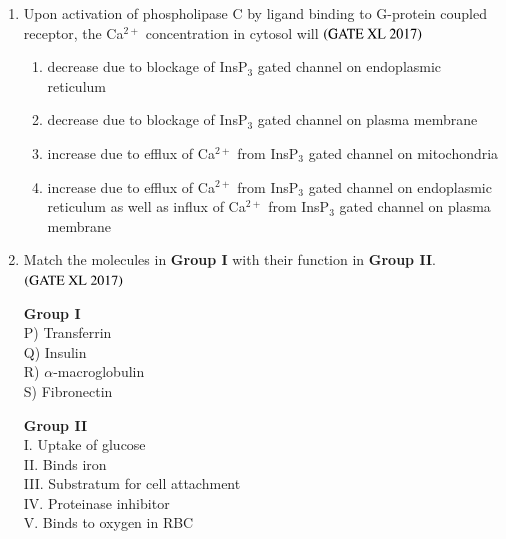 \documentclass[journal]{IEEEtran}
\begin{document}
\begin{enumerate}
\item Upon activation of phospholipase C by ligand binding to G-protein coupled receptor, the Ca$^{2+}$ concentration in cytosol will \hfill $\left(\text{GATE XL 2017}\right)$
\begin{enumerate}
    \item decrease due to blockage of InsP$_3$ gated channel on endoplasmic reticulum
    \item decrease due to blockage of InsP$_3$ gated channel on plasma membrane
    \item increase due to efflux of Ca$^{2+}$ from InsP$_3$ gated channel on mitochondria
    \item increase due to efflux of Ca$^{2+}$ from InsP$_3$ gated channel on endoplasmic reticulum as well as influx of Ca$^{2+}$ from InsP$_3$ gated channel on plasma membrane
\end{enumerate}

\item Match the molecules in \textbf{Group I} with their function in \textbf{Group II}. \hfill $\left(\text{GATE XL 2017}\right)$

\begin{multicols}{2}
\noindent \textbf{Group I} \\
P) Transferrin \\
Q) Insulin \\
R) $\alpha$-macroglobulin \\
S) Fibronectin \\

\columnbreak

\noindent \textbf{Group II} \\
I. Uptake of glucose \\
II. Binds iron \\
III. Substratum for cell attachment \\
IV. Proteinase inhibitor \\
V. Binds to oxygen in RBC \\
\end{multicols}

\begin{enumerate}
\end{enumerate}


\end{enumerate}
\end{document}
